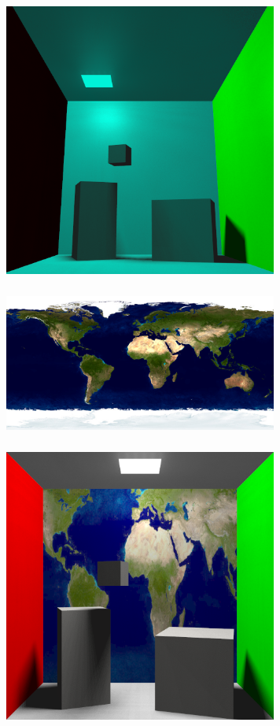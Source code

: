 \documentclass[acmtog]{acmart}
\begin{document}
\begin{figure}[h]
	\centering
	\includegraphics[width=9cm,height=9cm]{output2.png}
\end{figure}
\begin{figure}[h]
	\centering
	\includegraphics[width=9cm,height=5cm]{earthmap.jpg}
\end{figure}
\begin{figure}[h]
	\centering
	\includegraphics[width=9cm,height=9cm]{earth.png}
\end{figure}
\end{document}
